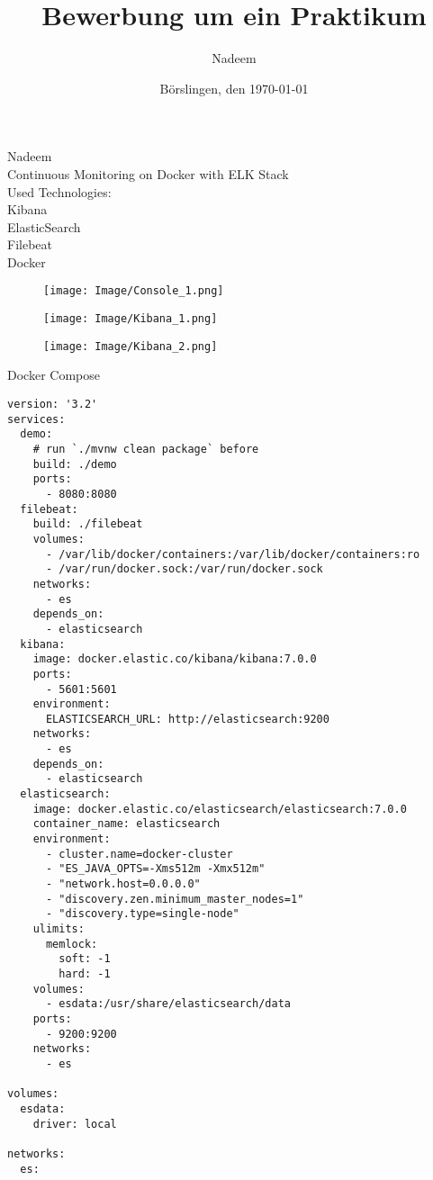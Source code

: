 \documentclass[12pt,a4paper]{article}
\title{Bewerbung um ein Praktikum}
\author{Nadeem}
\date{Börslingen, den \today}
\begin{document}
Nadeem\\
{\Large Continuous Monitoring on Docker with ELK Stack}\\

Used Technologies:\\
Kibana\\
ElasticSearch\\
Filebeat\\
Docker\\


\begin{figure}
  \texttt{[image: Image/Console\_1.png]}
\end{figure}

\begin{figure}
  \texttt{[image: Image/Kibana\_1.png]}
\end{figure}

\begin{figure}
  \texttt{[image: Image/Kibana\_2.png]}
\end{figure}


\newpage

Docker Compose
\begin{lstlisting}
version: '3.2'
services:
  demo:
    # run `./mvnw clean package` before
    build: ./demo
    ports:
      - 8080:8080
  filebeat:
    build: ./filebeat
    volumes:
      - /var/lib/docker/containers:/var/lib/docker/containers:ro
      - /var/run/docker.sock:/var/run/docker.sock
    networks:
      - es
    depends_on:
      - elasticsearch
  kibana:
    image: docker.elastic.co/kibana/kibana:7.0.0
    ports:
      - 5601:5601
    environment:
      ELASTICSEARCH_URL: http://elasticsearch:9200
    networks:
      - es
    depends_on:
      - elasticsearch
  elasticsearch:
    image: docker.elastic.co/elasticsearch/elasticsearch:7.0.0
    container_name: elasticsearch
    environment:
      - cluster.name=docker-cluster
      - "ES_JAVA_OPTS=-Xms512m -Xmx512m"
      - "network.host=0.0.0.0"
      - "discovery.zen.minimum_master_nodes=1"
      - "discovery.type=single-node"
    ulimits:
      memlock:
        soft: -1
        hard: -1
    volumes:
      - esdata:/usr/share/elasticsearch/data
    ports:
      - 9200:9200
    networks:
      - es

volumes:
  esdata:
    driver: local

networks:
  es:
\end{lstlisting}
\end{document}
